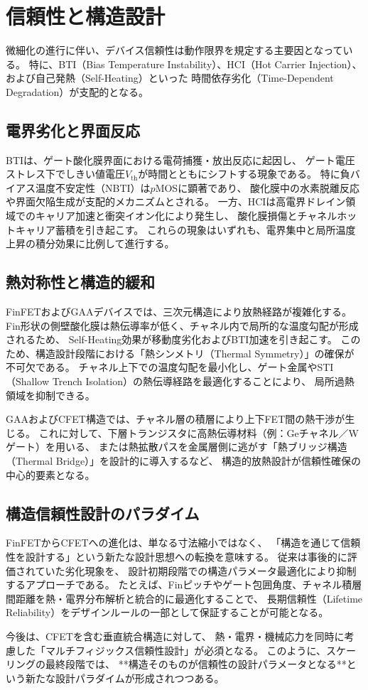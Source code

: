 \section{信頼性と構造設計}
微細化の進行に伴い、デバイス信頼性は動作限界を規定する主要因となっている。  
特に、BTI（Bias Temperature Instability）、HCI（Hot Carrier Injection）、および自己発熱（Self-Heating）といった
時間依存劣化（Time-Dependent Degradation）が支配的となる。

\subsection{電界劣化と界面反応}
BTIは、ゲート酸化膜界面における電荷捕獲・放出反応に起因し、  
ゲート電圧ストレス下でしきい値電圧$V_\text{th}$が時間とともにシフトする現象である。  
特に負バイアス温度不安定性（NBTI）は$p$MOSに顕著であり、  
酸化膜中の水素脱離反応や界面欠陥生成が支配的メカニズムとされる。  
一方、HCIは高電界ドレイン領域でのキャリア加速と衝突イオン化により発生し、  
酸化膜損傷とチャネルホットキャリア蓄積を引き起こす。  
これらの現象はいずれも、電界集中と局所温度上昇の積分効果に比例して進行する。

\subsection{熱対称性と構造的緩和}
FinFETおよびGAAデバイスでは、三次元構造により放熱経路が複雑化する。  
Fin形状の側壁酸化膜は熱伝導率が低く、チャネル内で局所的な温度勾配が形成されるため、  
Self-Heating効果が移動度劣化およびBTI加速を引き起こす。  
このため、構造設計段階における「熱シンメトリ（Thermal Symmetry）」の確保が不可欠である。  
チャネル上下での温度勾配を最小化し、ゲート金属やSTI（Shallow Trench Isolation）の熱伝導経路を最適化することにより、  
局所過熱領域を抑制できる。

GAAおよびCFET構造では、チャネル層の積層により上下FET間の熱干渉が生じる。  
これに対して、下層トランジスタに高熱伝導材料（例：Geチャネル／Wゲート）を用いる、  
または熱拡散パスを金属層側に逃がす「熱ブリッジ構造（Thermal Bridge）」を設計的に導入するなど、  
構造的放熱設計が信頼性確保の中心的要素となる。

\subsection{構造信頼性設計のパラダイム}
FinFETからCFETへの進化は、単なる寸法縮小ではなく、  
「構造を通じて信頼性を設計する」という新たな設計思想への転換を意味する。  
従来は事後的に評価されていた劣化現象を、  
設計初期段階での構造パラメータ最適化により抑制するアプローチである。  
たとえば、Finピッチやゲート包囲角度、チャネル積層間距離を熱・電界分布解析と統合的に最適化することで、  
長期信頼性（Lifetime Reliability）をデザインルールの一部として保証することが可能となる。

今後は、CFETを含む垂直統合構造に対して、  
熱・電界・機械応力を同時に考慮した「マルチフィジックス信頼性設計」が必須となる。  
このように、スケーリングの最終段階では、  
**構造そのものが信頼性の設計パラメータとなる**という新たな設計パラダイムが形成されつつある。
